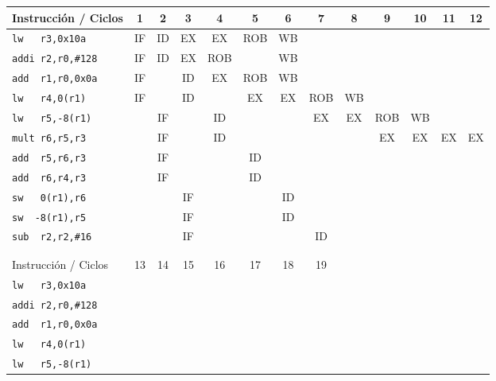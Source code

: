 \begin{ejercicio}
\begin{table}
    \centering
    \scriptsize
    \begin{tabular}{|l|c|c|c|c|c|c|c|c|c|c|c|c|}
        \hline
        Instrucción / Ciclos & 1 & 2 & 3 & 4 & 5 & 6 & 7 & 8 & 9 & 10 & 11 & 12 \\
        \hline
        \verb|lw   r3,0x10a|        & IF & ID & EX & EX & ROB & WB & & & & & &\\
        \hline        
        \verb|addi r2,r0,#128|      & IF & ID & EX & ROB & & WB & & & & & &\\
        \hline           
        \verb|add  r1,r0,0x0a|      & IF & & ID & EX & ROB & WB & & & & & &\\
        \hline                        
        \verb|lw   r4,0(r1)|        & IF & & ID & & EX & EX & ROB & WB & & & &\\
        \hline            
        \verb|lw   r5,-8(r1)|       & & IF & & ID & & & EX & EX & ROB & WB & &\\
        \hline
        \verb|mult r6,r5,r3|        & & IF & & ID & & & & & EX & EX & EX & EX \\
        \hline
        \verb|add  r5,r6,r3|        & & IF & & & ID & & & & & & &\\
        \hline
        \verb|add  r6,r4,r3|        & & IF & & & ID & & & & & & &\\
        \hline            
        \verb|sw   0(r1),r6|        & & & IF & & & ID & & & & & &\\
        \hline
        \verb|sw  -8(r1),r5|        & & & IF & & & ID & & & & & &\\
        \hline
        \verb|sub  r2,r2,#16|       & & & IF & & & & ID & & & & &\\
        \hline \\ \hline \\ \hline
        \hline
        Instrucción / Ciclos & 13 & 14 & 15 & 16 & 17 & 18 & 19 \\
        \hline
        \verb|lw   r3,0x10a|        & & & & & & &\\
        \hline        
        \verb|addi r2,r0,#128|      & & & & & & &\\
        \hline           
        \verb|add  r1,r0,0x0a|      & & & & & & &\\
        \hline                        
        \verb|lw   r4,0(r1)|        & & & & & & &\\
        \hline            
        \verb|lw   r5,-8(r1)|       & & & & & & &\\

\end{tabular}
\end{table}
\end{ejercicio}
